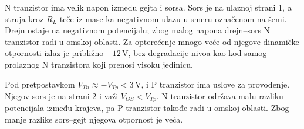 N tranzistor ima velik napon između gejta i sorsa. Sors je na ulaznoj strani 1, a struja kroz $R_L$ teče iz mase ka negativnom ulazu u smeru označenom na šemi. Drejn ostaje na negativnom potencijalu; zbog malog napona drejn–sors N tranzistor radi u omskoj oblasti. Za opterećenje mnogo veće od njegove dinamičke otpornosti izlaz je približno $-12\,\mathrm V$, bez degradacije nivoa kao kod samog prolaznog N tranzistora koji prenosi visoku jedinicu.

Pod pretpostavkom $V_{Tn}\approx-V_{Tp}<3\,\mathrm V$, i P tranzistor ima uslove za provođenje. Njegov sors je na strani 2 i važi $V_{GS}<V_{Tp}$. N tranzistor održava malu razliku potencijala između krajeva, pa P tranzistor takođe radi u omskoj oblasti. Zbog manje razlike sors–gejt njegova otpornost je veća.

